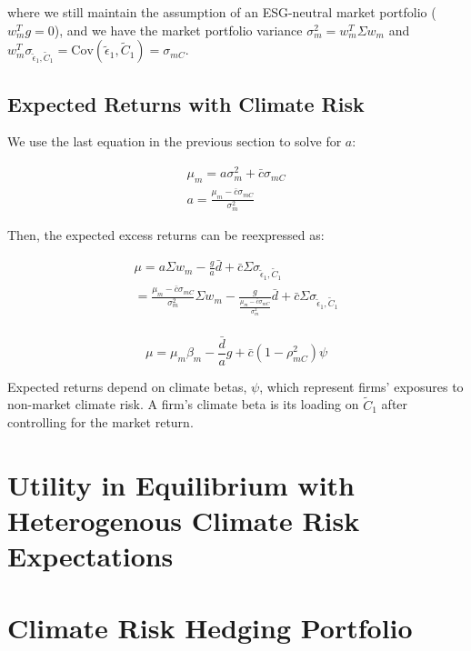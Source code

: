 where we still maintain the assumption of an ESG-neutral market portfolio ($w_m^Tg = 0$),
and we have the market portfolio variance 
$\sigma^2_m = w_m^T \Sigma w_m$ and 
$w_m^T \sigma_{\tilde{\epsilon}_1, \tilde{C}_1} = \text{Cov}(\tilde{\epsilon}_1, \tilde{C}_1) = \sigma_{mC}$.

\subsection{Expected Returns with Climate Risk}


We use the last equation in the previous section 
to solve for $a$:

\begin{equation}
    \begin{aligned}
        \mu_m = a \sigma^2_m + \bar{c} \sigma_{mC} \\
        a = \frac{\mu_m - \bar{c} \sigma_{mC}}{\sigma^2_m}
    \end{aligned}
\end{equation}

Then, the expected excess returns can be reexpressed as:

\begin{equation}
    \begin{aligned}
        \mu = a\Sigma w_m - \frac{g}{a} \bar{d} + \bar{c} \Sigma \sigma_{\tilde{\epsilon}_1, \tilde{C}_1} \\
        = \frac{\mu_m - \bar{c} \sigma_{mC}}{\sigma^2_m} \Sigma w_m - \frac{g}{\frac{\mu_m - \bar{c} \sigma_{mC}}{\sigma^2_m}} \bar{d} + \bar{c} \Sigma \sigma_{\tilde{\epsilon}_1, \tilde{C}_1} \\
    \end{aligned}
\end{equation}


\begin{equation}
    \mu = \mu_m \beta_m - \frac{\bar{d}}{a}g + \bar{c}(1 - \rho^2_{mC}) \psi 
\end{equation}

Expected returns depend on climate betas, $\psi$, which represent 
firms' exposures to non-market climate risk. A firm's climate 
beta is its loading on $\tilde{C}_1$ after controlling for the market return. 


\section{Utility in Equilibrium with Heterogenous 
Climate Risk Expectations}

\section{Climate Risk Hedging Portfolio}
